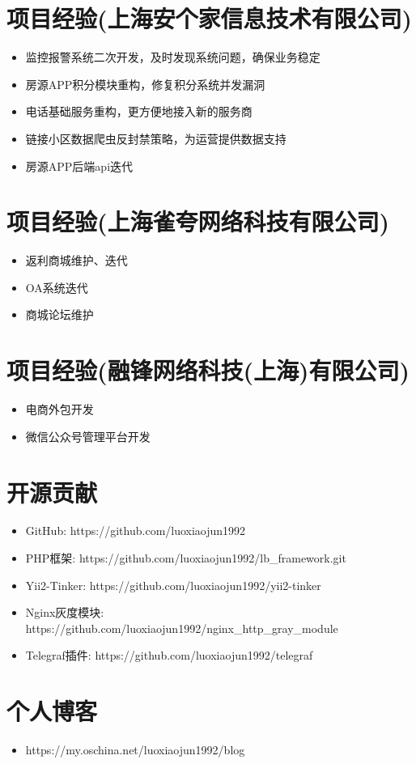 \documentclass[a4paper,12pt]{article}
\begin{document}
\begin{CJK}{UTF8}{gbsn}
		\section{项目经验(上海安个家信息技术有限公司)}
			\begin{itemize}
				\item{监控报警系统二次开发，及时发现系统问题，确保业务稳定}
				\item{房源APP积分模块重构，修复积分系统并发漏洞}
				\item{电话基础服务重构，更方便地接入新的服务商}
				\item{链接小区数据爬虫反封禁策略，为运营提供数据支持}
				\item{房源APP后端api迭代}
			\end{itemize}
		
		\section{项目经验(上海雀夸网络科技有限公司)}
			\begin{itemize}
				\item{返利商城维护、迭代}
				\item{OA系统迭代}
				\item{商城论坛维护}
			\end{itemize}
			
		\section{项目经验(融锋网络科技(上海)有限公司)}
			\begin{itemize}
				\item{电商外包开发}
				\item{微信公众号管理平台开发}
			\end{itemize}
		
		\section{开源贡献}
		 	\begin{itemize}
				\item{GitHub: https://github.com/luoxiaojun1992}
				\item{PHP框架: https://github.com/luoxiaojun1992/lb\_framework.git}
				\item{Yii2-Tinker: https://github.com/luoxiaojun1992/yii2-tinker}
				\item{Nginx灰度模块: https://github.com/luoxiaojun1992/nginx\_http\_gray\_module}
				\item{Telegraf插件: https://github.com/luoxiaojun1992/telegraf}
			\end{itemize}
		
		\section{个人博客}
			\begin{itemize}
				\item{https://my.oschina.net/luoxiaojun1992/blog}
			\end{itemize}

	\end{CJK}
\end{document}
